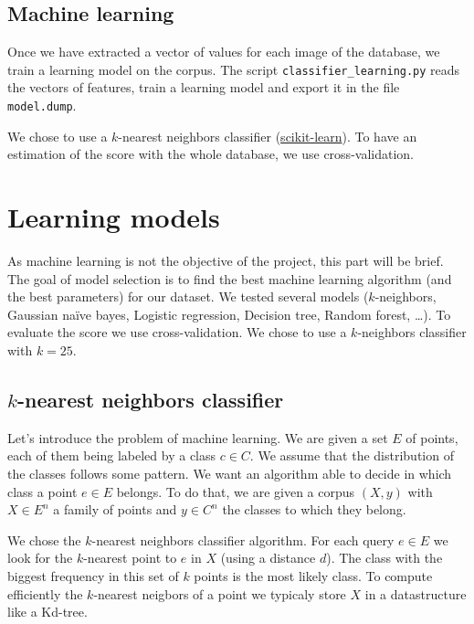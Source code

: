 \documentclass[a4paper, 11pt]{article}
\begin{document}
\subsection{Machine learning}

Once we have extracted a vector of values for each image of the database, we train a learning model on the corpus. The script \verb|classifier_learning.py| reads the vectors of features, train a learning model and export it in the file \verb|model.dump|.

\noindent We chose to use a $k$-nearest neighbors classifier (\href{http://scikit-learn.org/stable/modules/generated/sklearn.neighbors.KNeighborsClassifier.html}{scikit-learn}).
To have an estimation of the score with the whole database, we use cross-validation.

\newpage
\section{Learning models}

As machine learning is not the objective of the project, this part will be brief. The goal of model selection is to find the best machine learning algorithm (and the best parameters) for our dataset. We tested several models ($k$-neighbors, Gaussian naïve bayes, Logistic regression, Decision tree, Random forest, \dots). To evaluate the score we use cross-validation. We chose to use a $k$-neighbors classifier with $k= 25$.


\subsection{$k$-nearest neighbors classifier}

Let's introduce the problem of machine learning. We are given a set $E$ of points, each of them being labeled by a class $c \in C$. We assume that the distribution of the classes follows some pattern. We want an algorithm able to decide in which class a point $e \in E$ belongs. To do that, we are given a corpus $(X, y)$ with $X \in E^n$ a family of points and $y \in C^n$ the classes to which they belong. 

We chose the $k$-nearest neighbors classifier algorithm. For each query $e \in E$ we look for the $k$-nearest point to $e$ in $X$ (using a distance $d$). The class with the biggest frequency in this set of $k$ points is the most likely class. To compute efficiently the $k$-nearest neigbors of a point we typicaly store $X$ in a datastructure like a Kd-tree.
\end{document}
